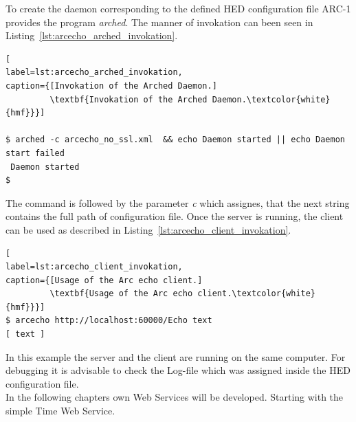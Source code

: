 To create the daemon corresponding to the defined HED configuration file ARC-1 provides the program \textit{arched}.
The manner of invokation can been seen in Listing~\ref{lst:arcecho_arched_invokation}.
\begin{program}
\begin{lstlisting}[
label=lst:arcecho_arched_invokation,
caption={[Invokation of the Arched Daemon.]
         \textbf{Invokation of the Arched Daemon.\textcolor{white}{hmf}}}]

$ arched -c arcecho_no_ssl.xml  && echo Daemon started || echo Daemon start failed
 Daemon started
$
\end{lstlisting}
\end{program}
%
%
The command is followed by the parameter \textit{c} which assignes, that the next string contains the full path of configuration file.
Once the server is running, the client can be used as described in Listing~\ref{lst:arcecho_client_invokation}.
\begin{program}
\begin{lstlisting}[
label=lst:arcecho_client_invokation,
caption={[Usage of the Arc echo client.]
         \textbf{Usage of the Arc echo client.\textcolor{white}{hmf}}}]
$ arcecho http://localhost:60000/Echo text
[ text ]
\end{lstlisting}
\end{program}
In this example the server and the client are running on the same computer. For debugging it is advisable to check the Log-file which was assigned inside the HED configuration file.\\


In the following chapters own Web Services will be developed. Starting with the simple Time Web Service.












